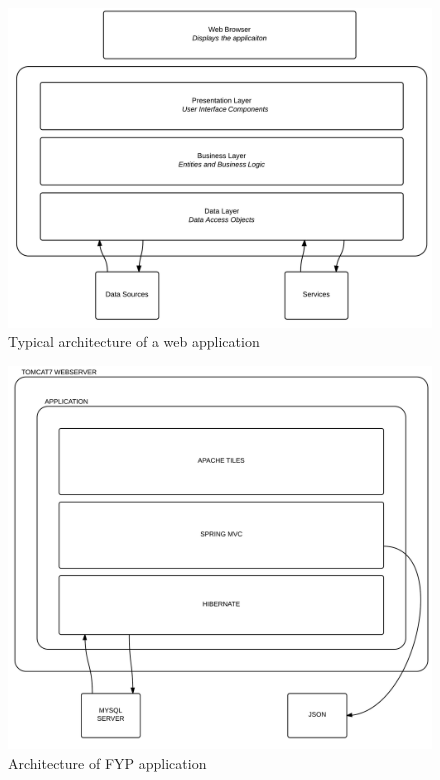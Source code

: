 \begin{figure}[H]
\begin{center}
\includegraphics[scale=0.18]{webapp.PNG}
\end{center}
\caption{Typical architecture of a web application}
\label{fig:webarch}
\end{figure}

\begin{figure}[H]
\begin{center}
\includegraphics[scale=0.18]{projarch.PNG}
\end{center}
\caption{Architecture of FYP application}
\label{fig:projstack}
\end{figure}


